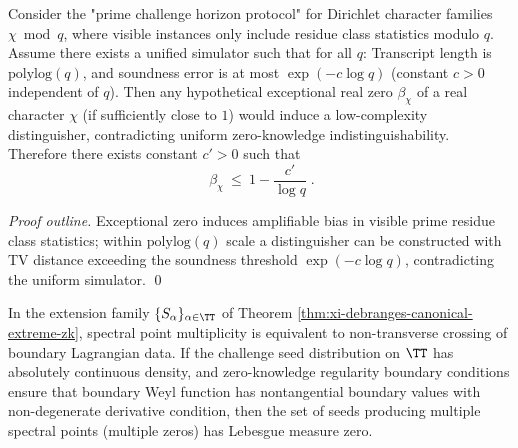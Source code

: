 \begin{proposition}\label{prop:xi-dirichlet-zero-free-from-unified-zk}
Consider the "prime challenge horizon protocol" for Dirichlet character families \(\chi\bmod q\), where visible instances only include residue class statistics modulo \(q\).
Assume there exists a unified simulator such that for all \(q\):
Transcript length is \(\mathrm{polylog}(q)\), and soundness error is at most \(\exp(-c\log q)\) (constant \(c>0\) independent of \(q\)).
Then any hypothetical exceptional real zero \(\beta_\chi\) of a real character \(\chi\) (if sufficiently close to \(1\)) would induce a low-complexity distinguisher, contradicting uniform zero-knowledge indistinguishability.
Therefore there exists constant \(c'>0\) such that
\[
\boxed{\;\beta_\chi\ \le\ 1-\frac{c'}{\log q}\; }.
\]
\end{proposition}
\begin{proof}[Proof outline]
Exceptional zero induces amplifiable bias in visible prime residue class statistics; within \(\mathrm{polylog}(q)\) scale a distinguisher can be constructed with TV distance exceeding the soundness threshold \(\exp(-c\log q)\), contradicting the uniform simulator. \qed
\end{proof}

\begin{corollary}\label{cor:xi-ae-simple-zeros-under-ac-seeds}
In the extension family \(\{S_\alpha\}_{\alpha\in\TT}\) of Theorem \ref{thm:xi-debranges-canonical-extreme-zk}, spectral point multiplicity is equivalent to non-transverse crossing of boundary Lagrangian data.
If the challenge seed distribution on \(\TT\) has absolutely continuous density, and zero-knowledge regularity boundary conditions ensure that boundary Weyl function has nontangential boundary values with non-degenerate derivative condition,
then the set of seeds producing multiple spectral points (multiple zeros) has Lebesgue measure zero.
\end{corollary}

